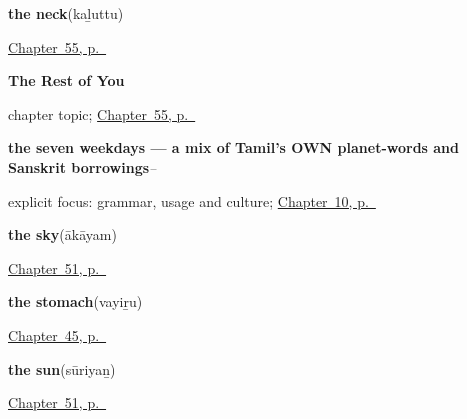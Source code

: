 \noindent\begin{minipage}[t]{\linewidth}
\raggedright
\textbf{the neck}\enspace\emph{}\enspace(kaḻuttu)\par
\footnotesize \hyperref[ch:ta-the-rest-of-you]{Chapter~55, p.~\pageref*{ch:ta-the-rest-of-you}}
\end{minipage}\par\smallskip

\noindent\begin{minipage}[t]{\linewidth}
\raggedright
\textbf{The Rest of You}\par
\footnotesize chapter topic; \hyperref[ch:ta-the-rest-of-you]{Chapter~55, p.~\pageref*{ch:ta-the-rest-of-you}}
\end{minipage}\par\smallskip

\noindent\begin{minipage}[t]{\linewidth}
\raggedright
\textbf{the seven weekdays — a mix of Tamil's OWN planet-words and Sanskrit borrowings}\enspace\emph{–}\par
\footnotesize explicit focus: grammar, usage and culture; \hyperref[ch:ta-days-of-the-week]{Chapter~10, p.~\pageref*{ch:ta-days-of-the-week}}
\end{minipage}\par\smallskip

\noindent\begin{minipage}[t]{\linewidth}
\raggedright
\textbf{the sky}\enspace\emph{}\enspace(ākāyam)\par
\footnotesize \hyperref[ch:ta-overhead]{Chapter~51, p.~\pageref*{ch:ta-overhead}}
\end{minipage}\par\smallskip

\noindent\begin{minipage}[t]{\linewidth}
\raggedright
\textbf{the stomach}\enspace\emph{}\enspace(vayiṟu)\par
\footnotesize \hyperref[ch:ta-body-more]{Chapter~45, p.~\pageref*{ch:ta-body-more}}
\end{minipage}\par\smallskip

\noindent\begin{minipage}[t]{\linewidth}
\raggedright
\textbf{the sun}\enspace\emph{}\enspace(sūriyaṉ)\par
\footnotesize \hyperref[ch:ta-overhead]{Chapter~51, p.~\pageref*{ch:ta-overhead}}
\end{minipage}\par\smallskip

